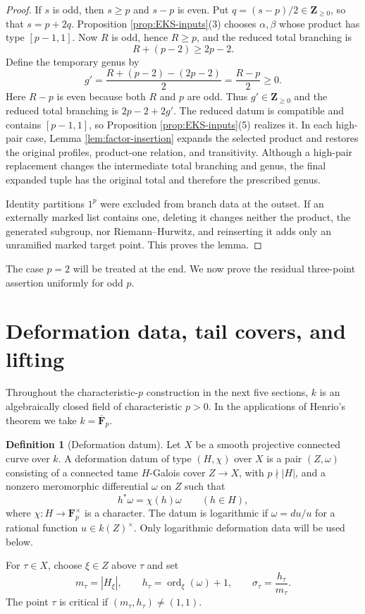 \documentclass[11pt]{amsart}
\theoremstyle{plain}
\theoremstyle{definition}
\newtheorem{definition}[theorem]{Definition}
\numberwithin{equation}{section}
\begin{document}
\begin{proof}
If $s$ is odd, then $s\geq p$ and $s-p$ is even.  Put
$q=(s-p)/2\in\mathbf Z_{\geq0}$, so that $s=p+2q$.  Proposition
\ref{prop:EKS-inputs}(3) chooses $\alpha,\beta$ whose product has type
$[p-1,1]$.  Now $R$ is odd, hence $R\geq p$,
and the reduced total branching is
\[
 R+(p-2)\geq2p-2.
\]
Define the temporary genus by
\[
 g'=\frac{R+(p-2)-(2p-2)}2=\frac{R-p}{2}\geq0.
\]
Here $R-p$ is even because both $R$ and $p$ are odd.  Thus
$g'\in\mathbf Z_{\geq0}$ and the reduced total branching is
$2p-2+2g'$.  The reduced datum is compatible and contains $[p-1,1]$, so
Proposition \ref{prop:EKS-inputs}(5) realizes it.
In each high-pair case, Lemma \ref{lem:factor-insertion} expands the selected
product and restores the original profiles, product-one relation, and
transitivity.  Although a high-pair
replacement changes the intermediate total branching and genus, the final
expanded tuple has the original total and therefore the prescribed genus.

Identity partitions $1^p$ were excluded from branch data at the outset.  If
an externally marked list contains one, deleting it changes neither the
product, the generated subgroup, nor Riemann--Hurwitz, and reinserting it adds
only an unramified marked target point.  This proves the lemma.
\end{proof}

The case $p=2$ will be treated at the end.  We now prove the residual
three-point assertion uniformly for odd $p$.

\section{Deformation data, tail covers, and lifting}

Throughout the characteristic-$p$ construction in the next five sections,
$k$ is an algebraically closed field of characteristic $p>0$.  In the
applications of Henrio's theorem we take $k=\overline{\mathbf F}_p$.

\begin{definition}[Deformation datum]\label{def:deformation-datum}
Let $X$ be a smooth projective connected curve over $k$.  A deformation
datum of type $(H,\chi)$ over $X$ is a pair $(Z,\omega)$ consisting of a
connected tame $H$-Galois cover $Z\to X$, with $p\nmid |H|$, and a nonzero
meromorphic differential $\omega$ on $Z$ such that
\[
 h^*\omega=\chi(h)\omega\qquad(h\in H),
\]
where $\chi:H\to\mathbf F_p^\times$ is a character.  The datum is
logarithmic if $\omega=du/u$ for a rational function $u\in k(Z)^\times$.
Only logarithmic deformation data will be used below.

For $\tau\in X$, choose $\xi\in Z$ above $\tau$ and set
\[
 m_\tau=|H_\xi|,\qquad
 h_\tau=\operatorname{ord}_\xi(\omega)+1,\qquad
 \sigma_\tau=\frac{h_\tau}{m_\tau}.
\]
The point $\tau$ is critical if $(m_\tau,h_\tau)\ne(1,1)$.
\end{definition}
\end{document}
